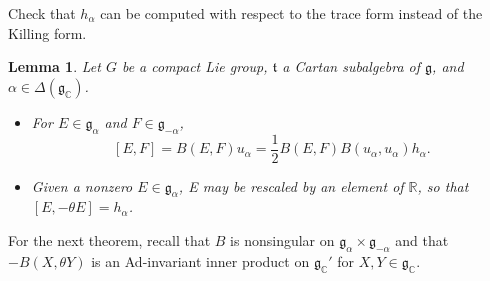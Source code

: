 \documentclass{article}
\theoremstyle{definition}
\theoremstyle{plain}
\newtheorem{lemma}[definition]{Lemma}
\begin{document}
Check that $ h_{\alpha} $ can be computed with respect to the trace form instead of the Killing form.

\begin{lemma}
    Let $ G $ be a compact Lie group, $ \mathfrak{t} $ a Cartan subalgebra of $ \mathfrak{g} $, and $ \alpha\in \Delta(\mathfrak{g}_{\mathbb{C} }) $.
    \begin{itemize}
        \item For $ E\in\mathfrak{g}_{\alpha} $ and $ F\in \mathfrak{g}_{-\alpha} $,\[
            [E,F]=B(E,F)u_{\alpha}=\frac{1}{2}B(E,F)B(u_{\alpha},u_{\alpha})h_{\alpha}.
        \]
        \item Given a nonzero $ E\in \mathfrak{g}_{\alpha} $, E may be rescaled by an element of $ \mathbb{R} $, so that $ [E,-\theta E]=h_{\alpha} $.
    \end{itemize}
\end{lemma}

For the next theorem, recall that $ B $ is nonsingular on $ \mathfrak{g}_{\alpha}\times \mathfrak{g}_{-\alpha} $ and that $ -B(X,\theta Y) $ is an Ad-invariant inner product on $ \mathfrak{g}_{\mathbb{C} }' $ for $ X,Y\in \mathfrak{g}_{\mathbb{C} } $.
\end{document}
